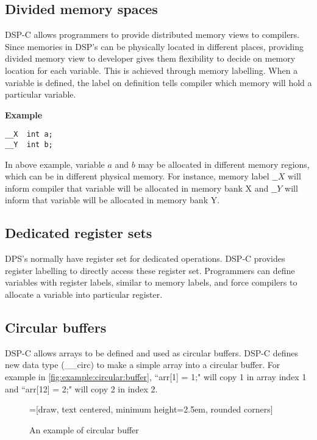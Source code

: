 \subsection{Divided memory spaces} \label{sec:memory:lable}

DSP-C allows programmers to provide distributed memory views to compilers. Since memories in DSP's can be physically located in different places, providing divided memory view to developer gives them flexibility to decide on memory location for each variable. This is achieved through memory labelling. When a variable is defined, the label on definition tells compiler which memory will hold a particular variable.

\textbf{Example}
\begin{lstlisting}
__X  int a;
__Y  int b;
\end{lstlisting}

In above example, variable $a$ and $b$ may be allocated in different memory regions, which can be in different physical memory. For instance, memory label $\_\_X$ will inform compiler that variable will be allocated in memory bank X and $\_\_Y$ will inform that variable will be allocated in memory bank Y.


\subsection{Dedicated register sets}
DPS's normally have register set for dedicated operations. DSP-C provides register labelling to directly access these register set. Programmers can define variables with register labels, similar to memory labels, and force compilers to allocate a variable into particular register.

\subsection{Circular buffers}
DSP-C allows arrays to be defined and used as circular buffers. DSP-C defines new data type (\_\_circ) to  make a simple array into a circular buffer. For example in \autoref{fig:example:circular:buffer}, ``arr[1] = 1;" will copy 1 in array index 1 and ``arr[12] = 2;" will copy  2 in index 2.
 
\begin{figure}[htbp]
    \centering
    =[draw, text centered, minimum height=2.5em, rounded corners]
   \caption{An example of circular buffer}
   \label{fig:example:circular:buffer}
\end{figure}

